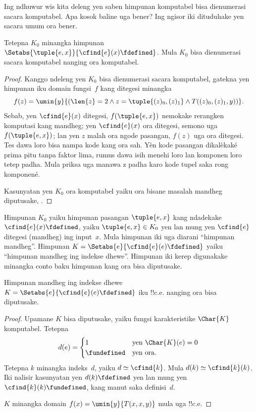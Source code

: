 \documentclass[../../../include/open-logic-section]{subfiles}
\begin{document}


Ing ndhuwur wis kita deleng yen saben himpunan
komputabel bisa dienumerasi sacara komputabel.
Apa kosok baline uga bener? Ing ngisor iki
dituduhake yen sacara umum ora bener.

\begin{thm}
Tetepna $K_0$ minangka himpunan
$\Setabs{\tuple{e, x}}{\cfind{e}(x) \fdefined}$.
Mula $K_0$ bisa dienumerasi sacara komputabel
nanging ora komputabel.
\end{thm}

\begin{proof}
Kanggo ndeleng yen $K_0$ bisa dienumerasi
sacara komputabel, gatekna yen himpunan iku
domain fungsi~$f$ kang ditegesi minangka
\[
f(z) = \umin{y}{(\len{z} = 2 \land z=\tuple{(z)_0,(z)_1} \land T((z)_0, (z)_1, y))}.
\]
Sebab, yen $\cfind{e}(x)$ ditegesi,
$f(\tuple{e, x})$ nemokake rerangken
komputasi kang mandheg; yen
$\cfind{e}(x)$ ora ditegesi, semono uga
$f(\tuple{e, x})$; lan yen $z$ malah ora
ngode pasangan, $f(z)$ uga ora ditegesi. Tes dawa loro bisa nampa kode kang ora sah. Yèn kode pasangan dikalèkaké prima pitu tanpa faktor lima, rumus dawa isih menehi loro lan komponen loro tetep padha. Mula priksa uga manawa z padha karo kode tupel saka rong komponené.

Kasunyatan yen $K_0$ ora komputabel yaiku
ora bisane masalah mandheg diputusake,
.
\end{proof}

Himpunan $K_0$ yaiku himpunan pasangan
$\tuple{e,x}$ kang ndadekake
$\cfind{e}(x) \fdefined$, yaiku
$\tuple{e,x} \in K_0$ yen lan mung yen
$\cfind{e}$ ditegesi (mandheg) ing
input~$x$. Mula himpunan iki uga diarani
``himpunan mandheg''. Himpunan
$K = \Setabs{e}{\cfind{e}(e) \fdefined}$
yaiku ``himpunan mandheg ing indekse dhewe''.
Himpunan iki kerep digunakake minangka
conto baku himpunan kang ora bisa diputusake.

\begin{thm}
Himpunan mandheg ing indekse dhewe
$K = \Setabs{e}{\cfind{e}(e) \fdefined}$
iku !!{c.e.} nanging ora bisa diputusake.
\end{thm}

\begin{proof}
  Upamane $K$ bisa diputusake, yaiku fungsi
  karakteristike $\Char{K}$ komputabel. Tetepna
  \[d(e) = \begin{cases}
  1 & \text{yen\/ $\Char{K}(e) = 0$}\\
  \fundefined & \text{yen ora.}
  \end{cases}
  \] 
  Tetepna $k$ minangka indeks~$d$, yaiku
  $d \simeq \cfind{k}$. Mula $d(k)
  \simeq \cfind{k}(k)$. Iki nalisir
  kasunyatan yen $d(k) \fdefined$ yen lan
  mung yen $\cfind{k}(k) \fundefined$,
  kang manut saka definisi~$d$.

  $K$ minangka domain $f(x) = \umin{y}{T(x,x,y)}$
  mula uga !!{c.e.}
\end{proof}
\end{document}
